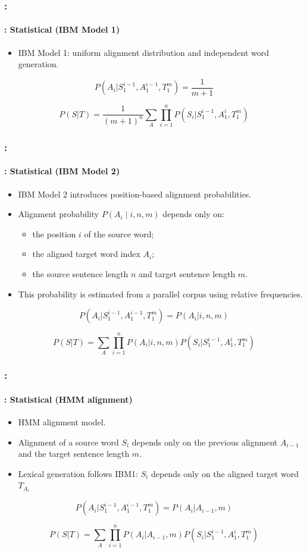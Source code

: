 \documentclass[xcolor=table]{beamer}
\begin{document}
\begin{frame}
	\frametitle{\insertshortsubtitle: \insertsection}
	\framesubtitle{\insertsubsection: Statistical (IBM Model 1)}
	
	\begin{itemize}
		\item IBM Model 1: uniform alignment distribution and independent word generation.
	\end{itemize}
	
	\[
	P(A_i | S_1^{i-1}, A_1^{i-1}, T_1^{m}) = \frac{1}{m+1}
	\]
	
	\[
	P(S|T) = \frac{1}{(m+1)^n} \sum_{A} \prod_{i=1}^{n} P(S_i | S_1^{i-1}, A_1^{i}, T_1^{m})
	\]
	
\end{frame}

\begin{frame}
	\frametitle{\insertshortsubtitle: \insertsection}
	\framesubtitle{\insertsubsection: Statistical (IBM Model 2)}
	
	\begin{itemize}
		\item IBM Model 2 introduces position-based alignment probabilities.
		\item Alignment probability $P(A_i \mid i, n, m)$ depends only on:
		\begin{itemize}
			\item the position $i$ of the source word;
			\item the aligned target word index $A_i$;
			\item the source sentence length $n$ and target sentence length $m$.
		\end{itemize}
		\item This probability is estimated from a parallel corpus using relative frequencies.
	\end{itemize}
	
	\[
	P(A_i | S_1^{i-1}, A_1^{i-1}, T_1^{m}) = P(A_i | i, n, m)
	\]
	
	\[
	P(S|T) = \sum_{A} \prod_{i=1}^{n} P(A_i | i, n, m) P(S_i | S_1^{i-1}, A_1^{i}, T_1^{m})
	\]
	
\end{frame}

\begin{frame}
	\frametitle{\insertshortsubtitle: \insertsection}
	\framesubtitle{\insertsubsection: Statistical (HMM alignment)}
	
	\begin{itemize}
		\item HMM alignment model.
		\item Alignment of a source word $S_i$ depends only on the previous alignment $A_{i-1}$ and the target sentence length $m$.
		\item Lexical generation follows IBM1: $S_i$ depends only on the aligned target word $T_{A_i}$
	\end{itemize}
	
	\[
	P(A_i | S_1^{i-1}, A_1^{i-1}, T_1^{m}) = P(A_i | A_{i-1}, m)
	\]
	
	\[
	P(S|T) = \sum_{A} \prod_{i=1}^{n} P(A_i | A_{i-1}, m) P(S_i | S_1^{i-1}, A_1^{i}, T_1^{m})
	\]
	
\end{frame}
\end{document}
